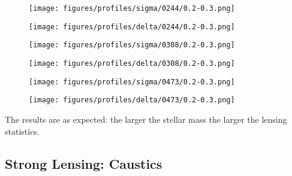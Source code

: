 \documentclass{beamer}
\begin{document}
  \begin{frame}
    \begin{figure}[H]
      \centering
      \texttt{[image: figures/profiles/sigma/0244/0.2-0.3.png]}
    \end{figure}
  \end{frame}

  \begin{frame}
    \begin{figure}[H]
      \centering
      \texttt{[image: figures/profiles/delta/0244/0.2-0.3.png]}
    \end{figure}
  \end{frame}

  \begin{frame}
    \begin{figure}[H]
      \centering
      \texttt{[image: figures/profiles/sigma/0308/0.2-0.3.png]}
    \end{figure}
  \end{frame}

  \begin{frame}
    \begin{figure}[H]
      \centering
      \texttt{[image: figures/profiles/delta/0308/0.2-0.3.png]}
    \end{figure}
  \end{frame}

  \begin{frame}
    \begin{figure}[H]
      \centering
      \texttt{[image: figures/profiles/sigma/0473/0.2-0.3.png]}
    \end{figure}
  \end{frame}

  \begin{frame}
    \begin{figure}[H]
      \centering
      \texttt{[image: figures/profiles/delta/0473/0.2-0.3.png]}
    \end{figure}
  \end{frame}

  \begin{frame}
    The results are as expected: the larger the stellar mass the larger the lensing statistics.
  \end{frame}

  \subsection{Strong Lensing: Caustics}
\end{document}
